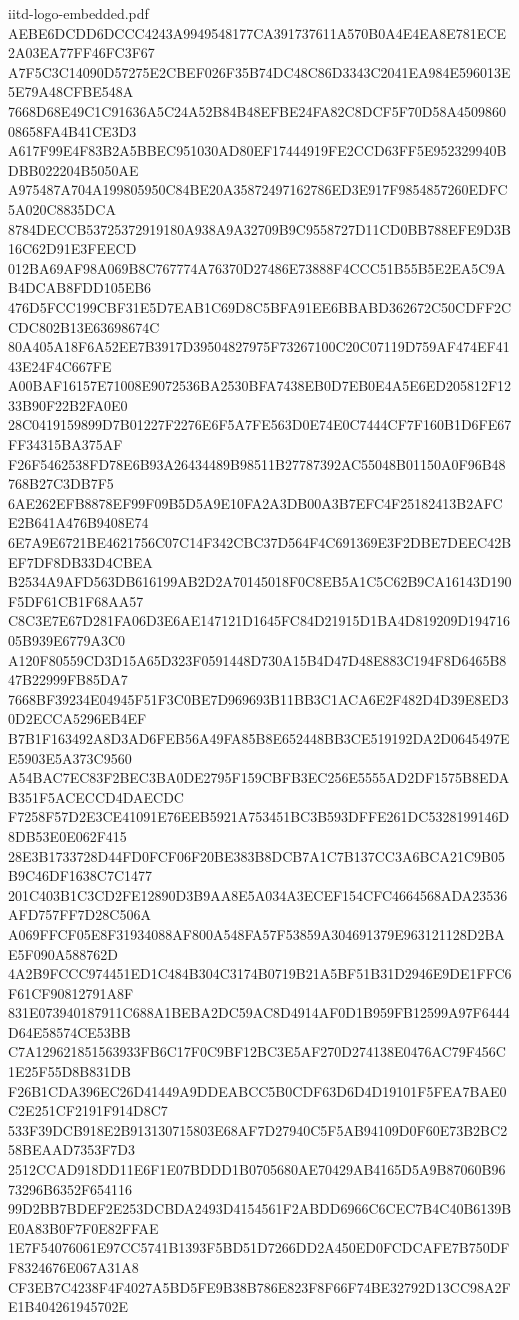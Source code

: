 \begin{filecontents*}[overwrite]{iitd-logo-embedded.pdf}
AEBE6DCDD6DCCC4243A9949548177CA391737611A570B0A4E4EA8E781ECE2A03EA77FF46FC3F67
A7F5C3C14090D57275E2CBEF026F35B74DC48C86D3343C2041EA984E596013E5E79A48CFBE548A
7668D68E49C1C91636A5C24A52B84B48EFBE24FA82C8DCF5F70D58A450986008658FA4B41CE3D3
A617F99E4F83B2A5BBEC951030AD80EF17444919FE2CCD63FF5E952329940BDBB022204B5050AE
A975487A704A199805950C84BE20A35872497162786ED3E917F9854857260EDFC5A020C8835DCA
8784DECCB53725372919180A938A9A32709B9C9558727D11CD0BB788EFE9D3B16C62D91E3FEECD
012BA69AF98A069B8C767774A76370D27486E73888F4CCC51B55B5E2EA5C9AB4DCAB8FDD105EB6
476D5FCC199CBF31E5D7EAB1C69D8C5BFA91EE6BBABD362672C50CDFF2CCDC802B13E63698674C
80A405A18F6A52EE7B3917D39504827975F73267100C20C07119D759AF474EF4143E24F4C667FE
A00BAF16157E71008E9072536BA2530BFA7438EB0D7EB0E4A5E6ED205812F1233B90F22B2FA0E0
28C0419159899D7B01227F2276E6F5A7FE563D0E74E0C7444CF7F160B1D6FE67FF34315BA375AF
F26F5462538FD78E6B93A26434489B98511B27787392AC55048B01150A0F96B48768B27C3DB7F5
6AE262EFB8878EF99F09B5D5A9E10FA2A3DB00A3B7EFC4F25182413B2AFCE2B641A476B9408E74
6E7A9E6721BE4621756C07C14F342CBC37D564F4C691369E3F2DBE7DEEC42BEF7DF8DB33D4CBEA
B2534A9AFD563DB616199AB2D2A70145018F0C8EB5A1C5C62B9CA16143D190F5DF61CB1F68AA57
C8C3E7E67D281FA06D3E6AE147121D1645FC84D21915D1BA4D819209D19471605B939E6779A3C0
A120F80559CD3D15A65D323F0591448D730A15B4D47D48E883C194F8D6465B847B22999FB85DA7
7668BF39234E04945F51F3C0BE7D969693B11BB3C1ACA6E2F482D4D39E8ED30D2ECCA5296EB4EF
B7B1F163492A8D3AD6FEB56A49FA85B8E652448BB3CE519192DA2D0645497EE5903E5A373C9560
A54BAC7EC83F2BEC3BA0DE2795F159CBFB3EC256E5555AD2DF1575B8EDAB351F5ACECCD4DAECDC
F7258F57D2E3CE41091E76EEB5921A753451BC3B593DFFE261DC5328199146D8DB53E0E062F415
28E3B1733728D44FD0FCF06F20BE383B8DCB7A1C7B137CC3A6BCA21C9B05B9C46DF1638C7C1477
201C403B1C3CD2FE12890D3B9AA8E5A034A3ECEF154CFC4664568ADA23536AFD757FF7D28C506A
A069FFCF05E8F31934088AF800A548FA57F53859A304691379E963121128D2BAE5F090A588762D
4A2B9FCCC974451ED1C484B304C3174B0719B21A5BF51B31D2946E9DE1FFC6F61CF90812791A8F
831E073940187911C688A1BEBA2DC59AC8D4914AF0D1B959FB12599A97F6444D64E58574CE53BB
C7A129621851563933FB6C17F0C9BF12BC3E5AF270D274138E0476AC79F456C1E25F55D8B831DB
F26B1CDA396EC26D41449A9DDEABCC5B0CDF63D6D4D19101F5FEA7BAE0C2E251CF2191F914D8C7
533F39DCB918E2B913130715803E68AF7D27940C5F5AB94109D0F60E73B2BC258BEAAD7353F7D3
2512CCAD918DD11E6F1E07BDDD1B0705680AE70429AB4165D5A9B87060B9673296B6352F654116
99D2BB7BDEF2E253DCBDA2493D4154561F2ABDD6966C6CEC7B4C40B6139BE0A83B0F7F0E82FFAE
1E7F54076061E97CC5741B1393F5BD51D7266DD2A450ED0FCDCAFE7B750DFF8324676E067A31A8
CF3EB7C4238F4F4027A5BD5FE9B38B786E823F8F66F74BE32792D13CC98A2FE1B404261945702E

\end{filecontents*}
